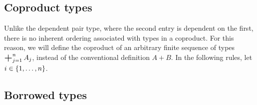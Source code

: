 \documentclass[11pt]{book}
\DeclareMathOperator*{\bigplus}{\scalerel*{+}{\textstyle\sum}}
\begin{document}
\subsection{Coproduct types}

Unlike the dependent pair type, where the second entry is dependent on the first, there is no inherent ordering associated with types in a coproduct.
For this reason, we will define the coproduct of an arbitrary finite sequence of types \( \bigplus_{j=1}^n A_j \), instead of the conventional definition \( A + B \).
In the following rules, let \( i \in \qty{1, \dots, n} \).



\subsection{Borrowed types}
\end{document}
